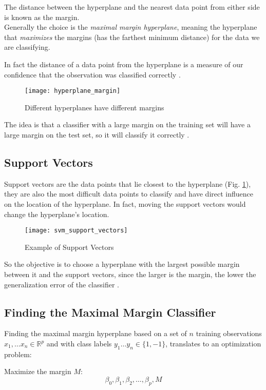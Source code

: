 The distance between the hyperplane and the nearest data point from either side is known as the margin.\\
Generally the choice is the \textit{maximal margin hyperplane}, meaning the hyperplane that \textit{maximizes} the margins (has the farthest minimum distance) for the data we are classifying.

In fact the distance of a data point from the hyperplane is a measure of our confidence that the observation was classified correctly \cite{ISLR}.

\begin{figure}[H]
	\centering
	\texttt{[image: hyperplane\_margin]}
	\caption{Different hyperplanes have different margins \cite{svm_monkeylearn}}
\end{figure}

The idea is that a classifier with a large margin on the training set will have a large margin on the test set, so it will classify it correctly \cite{ISLR}.

\subsection{Support Vectors}
Support vectors are the data points that lie closest to the hyperplane (Fig. \ref{fig:suppvec}), they are also the most difficult data points to classify and have direct influence on the location of the hyperplane. In fact, moving the support vectors would change the hyperplane's location.

\begin{figure}[H]
	\centering
	\texttt{[image: svm\_support\_vectors]}
	\caption{Example of Support Vectors}
	\label{fig:suppvec}
\end{figure}

So the objective is to choose a hyperplane with the largest possible margin between it and the support vectors, since the larger is the margin, the lower the generalization error of the classifier \cite{ISLR}.

\subsection{Finding the Maximal Margin Classifier}
Finding the maximal margin hyperplane based on a set of $n$ training observations $x_1, \dots x_n \in \mathbb{R}^p$ and with class labels $y_1 \dots y_n \in \{1, -1\}$, translates to an optimization problem:

Maximize the margin $M$:
\begin{equation} \label{eq:svm1}
	\beta_0, \beta_1, \beta_2, \dots, \beta_p, M
\end{equation}

